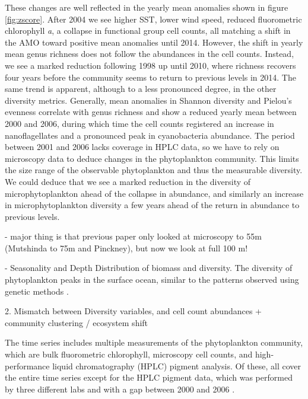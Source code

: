 These changes are well reflected in the yearly mean anomalies shown in figure \ref{fig:zscore}. After 2004 we see higher SST, lower wind speed, reduced fluorometric chlorophyll \textit{a}, a collapse in functional group cell counts, all matching a shift in the AMO toward positive mean anomalies until 2014.
However, the shift in yearly mean genus richness does not follow the abundances in the cell counts. Instead, we see a marked reduction following 1998 up until 2010, where richness recovers four years before the community seems to return to previous levels in 2014. The same trend is apparent, although to a less pronounced degree, in the other diversity metrics. Generally, mean anomalies in Shannon diversity and Pielou's evenness correlate with genus richness and show a reduced yearly mean between 2000 and 2006, during which time the cell counts registered an increase in nanoflagellates and a pronounced peak in cyanobacteria abundance. 
The period between 2001 and 2006 lacks coverage in HPLC data, so we have to rely on microscopy data to deduce changes in the phytoplankton community. This limits the size range of the observable phytoplankton and thus the measurable diversity. We could deduce that we see a marked reduction in the diversity of microphytoplankton ahead of the collapse in abundance, and similarly an increase in microphytoplankton diversity a few years ahead of the return in abundance to previous levels. 

- major thing is that previous paper only looked at microscopy to 55m (Mutshinda to 75m and Pinckney), but now we look at full 100 m!

- Seasonality and Depth Distribution of biomass and diversity.
The diversity of phytoplankton peaks in the surface ocean, similar to the patterns observed using genetic methods \cite{yeh_contrasting_2022}.



2. Mismatch between Diversity variables, and cell count abundances + community clustering / ecosystem shift

   The time series includes multiple measurements of the phytoplankton community, which are bulk fluorometric chlorophyll, microscopy cell counts, and high-performance liquid chromatography (HPLC) pigment analysis. Of these, all cover the entire time series except for the HPLC pigment data, which was performed by three different labs and with a gap between 2000 and 2006 \cite{muller-karger_scientific_2019}. 

